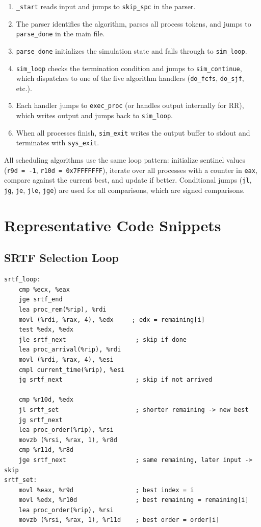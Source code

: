 \documentclass[a4paper,12pt]{article}
\begin{document}
\begin{enumerate}
    \item \texttt{\_start} reads input and jumps to \texttt{skip\_spc} in the parser.
    \item The parser identifies the algorithm, parses all process tokens, and jumps to \texttt{parse\_done} in the main file.
    \item \texttt{parse\_done} initializes the simulation state and falls through to \texttt{sim\_loop}.
    \item \texttt{sim\_loop} checks the termination condition and jumps to \texttt{sim\_continue}, which dispatches to one of the five algorithm handlers (\texttt{do\_fcfs}, \texttt{do\_sjf}, etc.).
    \item Each handler jumps to \texttt{exec\_proc} (or handles output internally for RR), which writes output and jumps back to \texttt{sim\_loop}.
    \item When all processes finish, \texttt{sim\_exit} writes the output buffer to stdout and terminates with \texttt{sys\_exit}.
\end{enumerate}

All scheduling algorithms use the same loop pattern: initialize sentinel values (\texttt{r9d = -1}, \texttt{r10d = 0x7FFFFFFF}), iterate over all processes with a counter in \texttt{eax}, compare against the current best, and update if better. Conditional jumps (\texttt{jl}, \texttt{jg}, \texttt{je}, \texttt{jle}, \texttt{jge}) are used for all comparisons, which are signed comparisons.

\section{Representative Code Snippets}

\subsection{SRTF Selection Loop}

\begin{lstlisting}[style=AsmStyle]
srtf_loop:
    cmp %ecx, %eax
    jge srtf_end
    lea proc_rem(%rip), %rdi
    movl (%rdi, %rax, 4), %edx     ; edx = remaining[i]
    test %edx, %edx
    jle srtf_next                   ; skip if done
    lea proc_arrival(%rip), %rdi
    movl (%rdi, %rax, 4), %esi
    cmpl current_time(%rip), %esi
    jg srtf_next                    ; skip if not arrived

    cmp %r10d, %edx
    jl srtf_set                     ; shorter remaining -> new best
    jg srtf_next
    lea proc_order(%rip), %rsi
    movzb (%rsi, %rax, 1), %r8d
    cmp %r11d, %r8d
    jge srtf_next                   ; same remaining, later input -> skip
srtf_set:
    movl %eax, %r9d                 ; best index = i
    movl %edx, %r10d                ; best remaining = remaining[i]
    lea proc_order(%rip), %rsi
    movzb (%rsi, %rax, 1), %r11d    ; best order = order[i]
\end{lstlisting}
\end{document}
